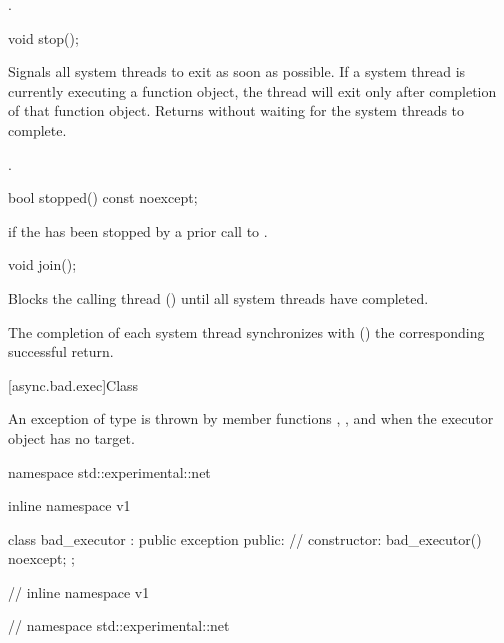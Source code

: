 \begin{itemdescr}
\pnum
\returns {}.
\end{itemdescr}

%
\begin{itemdecl}
void stop();
\end{itemdecl}

\begin{itemdescr}
\pnum
\effects Signals all system threads to exit as soon as possible. If a system thread is currently executing a function object, the thread will exit only after completion of that function object. Returns without waiting for the system threads to complete.

\pnum
\postconditions {}.
\end{itemdescr}

%
\begin{itemdecl}
bool stopped() const noexcept;
\end{itemdecl}

\begin{itemdescr}
\pnum
\returns {} if the  has been stopped by a prior call to .
\end{itemdescr}

%
\begin{itemdecl}
void join();
\end{itemdecl}

\begin{itemdescr}
\pnum
\effects Blocks the calling thread () until all system threads have completed.

\pnum
\sync The completion of each system thread synchronizes with () the corresponding successful  return.
\end{itemdescr}



[async.bad.exec]{Class }

%
\pnum
An exception of type  is thrown by  member functions , , and  when the executor object has no target.

\begin{codeblock}
namespace std::experimental::net {
inline namespace v1 {

  class bad_executor : public exception
  {
  public:
    // constructor:
    bad_executor() noexcept;
  };

} // inline namespace v1
} // namespace std::experimental::net
\end{codeblock}


